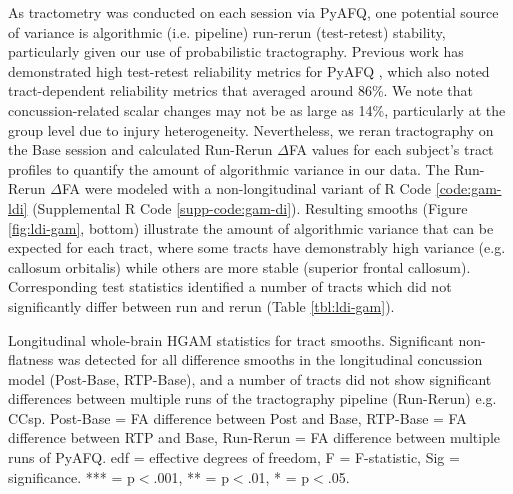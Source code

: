 \documentclass[12pt]{article}
\begin{document}



As tractometry was conducted on each session via PyAFQ, one potential source of variance is algorithmic (i.e. pipeline) run-rerun (test-retest) stability, particularly given our use of probabilistic tractography. Previous work has demonstrated high test-retest reliability metrics for PyAFQ \parencite{kruper2021EvaluatingReliabilityHuman}, which also noted tract-dependent reliability metrics that averaged around 86\%. We note that concussion-related scalar changes may not be as large as 14\%, particularly at the group level due to injury heterogeneity. Nevertheless, we reran tractography on the Base session and calculated Run-Rerun $\Delta$FA values for each subject's tract profiles to quantify the amount of algorithmic variance in our data. The Run-Rerun $\Delta$FA were modeled with a non-longitudinal variant of R Code \ref{code:gam-ldi} (Supplemental R Code \ref{supp-code:gam-di}). Resulting smooths (Figure \ref{fig:ldi-gam}, bottom) illustrate the amount of algorithmic variance that can be expected for each tract, where some tracts have demonstrably high variance (e.g. callosum orbitalis) while others are more stable (superior frontal callosum). Corresponding test statistics identified a number of tracts which did not significantly differ between run and rerun (Table \ref{tbl:ldi-gam}).

\begin{table}[H]
	\scriptsize
	
	\caption{Longitudinal whole-brain HGAM statistics for tract smooths. Significant non-flatness was detected for all difference smooths in the longitudinal concussion model (Post-Base, RTP-Base), and a number of tracts did not show significant differences between multiple runs of the tractography pipeline (Run-Rerun) e.g. CCsp. Post-Base = FA difference between Post and Base, RTP-Base = FA difference between RTP and Base, Run-Rerun = FA difference between multiple runs of PyAFQ. edf = effective degrees of freedom, F = F-statistic, Sig = significance. *** = p$<$.001, ** = p$<$.01, * = p$<$.05.}
	\label{tbl:ldi-gam}
\end{table}
\end{document}
